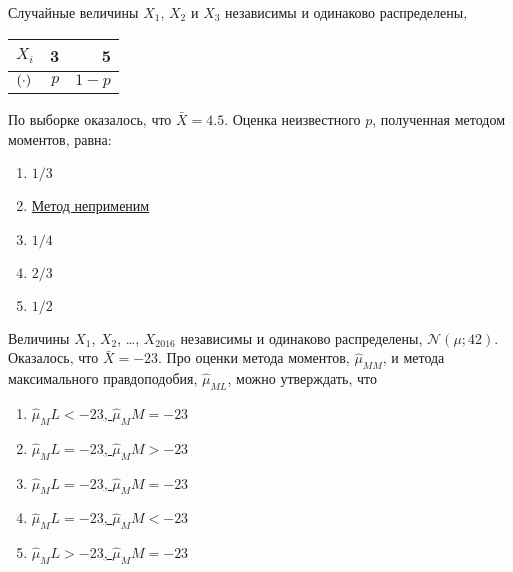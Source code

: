 \documentclass[t]{beamer}
\let\P\relax
\DeclareMathOperator{\P}{\mathbb{P}}
\newcommand{\cN}{\mathcal{N}}
\begin{document}
 \begin{frame} \label{33} 
\begin{block}{33} 

    Случайные величины $X_1$, $X_2$ и $X_3$ независимы и одинаково распределены,

\begin{center}
    \begin{tabular}{lrr} \toprule
    $X_i$ & 3 & 5 \\
    \midrule
    $\P(\cdot)$ & $p$ & $1-p$ \\
    \bottomrule
    \end{tabular}
\end{center}

    По выборке оказалось, что $\bar X = 4.5$. Оценка неизвестного $p$, полученная методом моментов, равна:


    


 \end{block} 
\begin{enumerate} 
\item[] \hyperlink{33-No}{\beamergotobutton{} $1/3$}
\item[] \hyperlink{33-No}{\beamergotobutton{} Метод неприменим}
\item[] \hyperlink{33-Yes}{\beamergotobutton{} $1/4$}
\item[] \hyperlink{33-No}{\beamergotobutton{} $2/3$}
\item[] \hyperlink{33-No}{\beamergotobutton{} $1/2$}
\end{enumerate} 
\end{frame} 


 \begin{frame} \label{34} 
\begin{block}{34} 

  Величины $X_1$, $X_2$, \ldots, $X_{2016}$ независимы и одинаково распределены, $\cN(\mu ; 42)$. Оказалось, что $\bar X =  -23$. Про оценки метода моментов, $\hat \mu_{MM}$, и метода максимального правдоподобия, $\hat \mu_{ML}$, можно утверждать, что


 \end{block} 
\begin{enumerate} 
\item[] \hyperlink{34-No}{\beamergotobutton{} $\hat \mu_ML < -23$, $\hat\mu_MM = -23$}
\item[] \hyperlink{34-No}{\beamergotobutton{} $\hat \mu_ML = -23$, $\hat\mu_MM > -23$}
\item[] \hyperlink{34-Yes}{\beamergotobutton{} $\hat \mu_ML = -23$, $\hat\mu_MM = -23$}
\item[] \hyperlink{34-No}{\beamergotobutton{} $\hat \mu_ML = -23$, $\hat\mu_MM < -23$}
\item[] \hyperlink{34-No}{\beamergotobutton{} $\hat \mu_ML > -23$, $\hat\mu_MM = -23$}
\end{enumerate} 
\end{frame} 
\end{document}
